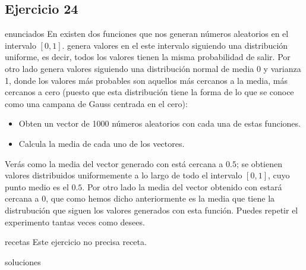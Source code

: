 \subsection{Ejercicio 24}
\def\parte{enunciados}
\ifx\capitulo\parte
En \mt existen dos funciones que nos generan números aleatorios en el intervalo $[0,1]$.  genera valores en el este intervalo siguiendo una distribución uniforme, es decir, todos los valores tienen la misma probabilidad de salir. Por otro lado  genera valores siguiendo una distribución normal de media 0 y varianza 1, donde los valores más probables son aquellos más cercanos a la media, más cercanos a cero (puesto que esta distribución tiene la forma de lo que se conoce como una campana de Gauss centrada en el cero):

\begin{itemize}
\item Obten un vector de 1000 números aleatorios con cada una de estas funciones.
\item Calcula la media de cada uno de los vectores.
\end{itemize}

Verás como la media del vector generado con  está cercana a $0.5$; se obtienen valores distribuidos uniformemente a lo largo de todo el intervalo $[0,1]$, cuyo punto medio es el $0.5$. Por otro lado la media del vector obtenido con  estará cercana a $0$, que como hemos dicho anteriormente es la media que tiene la distrubución que siguen los valores generados con esta función. Puedes repetir el experimento tantas veces como desees.
\fi

\def\parte{recetas}
\ifx\capitulo\parte
Este ejercicio no precisa receta.
\fi

\def\parte{soluciones}
\ifx\capitulo\parte

\fi

